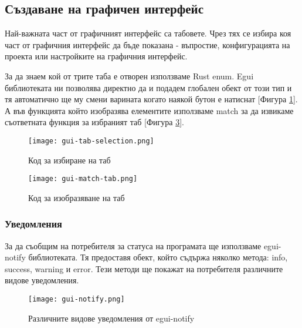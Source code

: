 
\subsection{Създаване на графичен интерфейс}
Най-важната част от графичният интерфейс са табовете. Чрез тях се избира коя
част от графичния интерфейс да бъде показана - въпростие, конфигурацията на
проекта или настройките на графичния интерфейс.

За да знаем кой от трите таба е отворен използваме Rust enum. Egui библиотеката
ни позволява директно да и подадем глобален обект от този тип и тя автоматично
ще му смени варината когато наякой бутон е натиснат [Фигура
\ref{fig:gui-tab-selection}]. А във функцията който изобразява елементите
използваме match за да извикаме съответната функция за избраният таб [Фигура
\ref{fig:gui-match-tab}].

\begin{figure}[!htb]
    \centering
    \texttt{[image: gui-tab-selection.png]}
    \caption{Код за избиране на таб}
    \label{fig:gui-tab-selection}
\end{figure}
\begin{figure}[!htb]
    \centering
    \texttt{[image: gui-match-tab.png]}
    \caption{Код за изобразяване на таб}
    \label{fig:gui-match-tab}
\end{figure}

\subsubsection{Уведомления}
За да съобщим на потребителя за статуса на програмата ще използваме egui-notify
библиотеката. Тя предоставя обект, който съдържа няколко метода: info, success, warning и error.
Тези методи ще покажат на потребителя различните видове уведомления.
\begin{figure}[!htb]
    \centering
    \texttt{[image: gui-notify.png]}
    \caption{Различните видове уведомления от egui-notify}
    \label{fig:gui-match-tab}
\end{figure}




